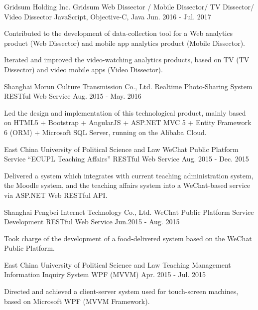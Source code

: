 \begin{cventries}
  \cventry
    {Gridsum Holding Inc.}
    {Gridsum Web Dissector / Mobile Dissector/ TV Dissector/ Video Dissector}
    {JavaScript, Objective-C, Java}
    {Jun. 2016 - Jul. 2017}
    {
      \begin{cvitems}
        \item {Contributed to the development of data-collection tool for a Web analytics product (Web Dissector) and mobile app analytics product (Mobile Dissector).}
        \item {Iterated and improved the video-watching analytics products, based on TV (TV Dissector) and video mobile apps (Video Dissector).}
      \end{cvitems}
    }
    
  \cventry
    {Shanghai Morun Culture Transmission Co., Ltd.}
    {Realtime Photo-Sharing System}
    {RESTful Web Service}
    {Aug. 2015 - May. 2016}
    {
      \begin{cvitems}
        \item {Led the design and implementation of this technological product, mainly based on HTML5 + Bootstrap + AngularJS + ASP.NET MVC 5 + Entity Framework 6 (ORM) + Microsoft SQL Server, running on the Alibaba Cloud.}
      \end{cvitems}
    }
    
  \cventry
    {East China University of Political Science and Law}
    {WeChat Public Platform Service “ECUPL Teaching Affairs”}
    {RESTful Web Service}
    {Aug. 2015 - Dec. 2015}
    {
      \begin{cvitems}
        \item {Delivered a system which integrates with current teaching administration system, the Moodle system, and the teaching affairs system into a WeChat-based service via ASP.NET Web RESTful API.}
      \end{cvitems}
    }
    
  \cventry
    {Shanghai Pengbei Internet Technology Co., Ltd.}
    {WeChat Public Platform Service Development}
    {RESTful Web Service}
    {Jun.2015 - Aug. 2015}
    {
      \begin{cvitems}
        \item {Took charge of the development of a food-delivered system based on the WeChat Public Platform.}
      \end{cvitems}
    }
    
  \cventry
    {East China University of Political Science and Law}
    {Teaching Management Information Inquiry System}
    {WPF (MVVM)}
    {Apr. 2015 - Jul. 2015}
    {
      \begin{cvitems}
        \item {Directed and achieved a client-server system used for touch-screen machines, based on Microsoft WPF (MVVM Framework).}
      \end{cvitems}
    }
    

\end{cventries}
